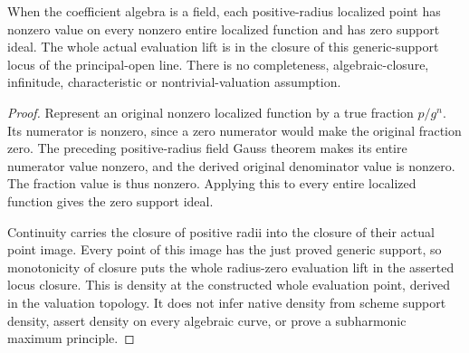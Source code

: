 \begin{theorem}
\label{spectrum:line-evaluation-generic-closure}
\leanok
{}
When the coefficient algebra is a field, each positive-radius localized
point has nonzero value on every nonzero entire localized function
and has zero support ideal. The whole actual evaluation lift is in
the closure of this generic-support locus of the principal-open line.
There is no completeness, algebraic-closure, infinitude, characteristic
or nontrivial-valuation assumption.
\end{theorem}
\begin{proof}
Represent an original nonzero localized function by a true fraction
$p/g^n$. Its numerator is nonzero, since a zero numerator would make
the original fraction zero. The preceding positive-radius field
Gauss theorem makes its entire numerator value nonzero, and the
derived original denominator value is nonzero. The fraction value
is thus nonzero. Applying this to every entire localized function
gives the zero support ideal.

Continuity carries the closure of positive radii into the closure
of their actual point image. Every point of this image has the just
proved generic support, so monotonicity of closure puts the whole
radius-zero evaluation lift in the asserted locus closure.
This is density at the constructed whole evaluation point, derived
in the valuation topology. It does not infer native density from
scheme support density, assert density on every algebraic curve,
or prove a subharmonic maximum principle.
\end{proof}
